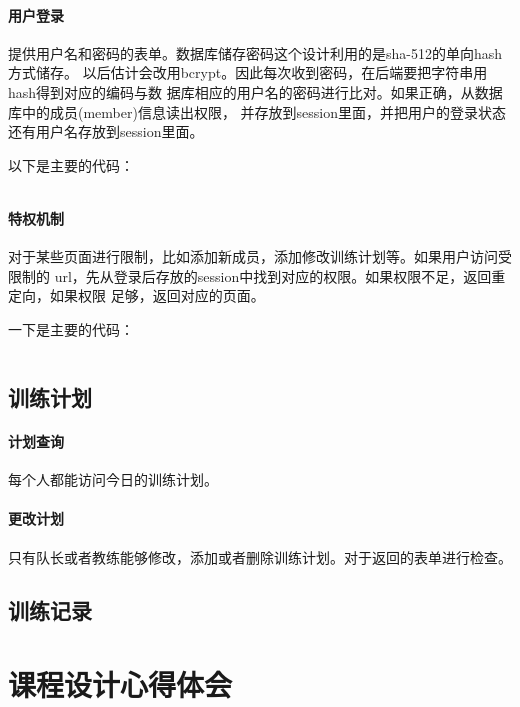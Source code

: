 \paragraph{用户登录}
提供用户名和密码的表单。数据库储存密码这个设计利用的是sha-512的单向hash方式储存。
以后估计会改用bcrypt。因此每次收到密码，在后端要把字符串用hash得到对应的编码与数
据库相应的用户名的密码进行比对。如果正确，从数据库中的成员(member)信息读出权限，
并存放到session里面，并把用户的登录状态还有用户名存放到session里面。

\vspace{3em}
以下是主要的代码：
\begin{Verbatim}[]

\end{Verbatim}

\vspace{3em}
\paragraph{特权机制}
对于某些页面进行限制，比如添加新成员，添加修改训练计划等。如果用户访问受限制的
url，先从登录后存放的session中找到对应的权限。如果权限不足，返回重定向，如果权限
足够，返回对应的页面。

\vspace{3em}
一下是主要的代码：
\begin{Verbatim}[]

\end{Verbatim}

\subsection{训练计划}
\paragraph{计划查询}
每个人都能访问今日的训练计划。

\paragraph{更改计划}
只有队长或者教练能够修改，添加或者删除训练计划。对于返回的表单进行检查。

\subsection{训练记录}

\section{课程设计心得体会}





